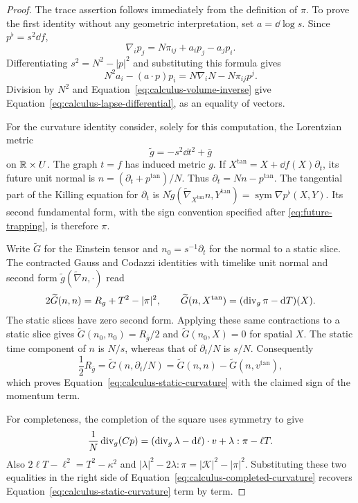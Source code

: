\begin{proof}
The trace assertion follows immediately from the definition of $\pi$.
To prove the first identity without any geometric interpretation, set
$a=\dd\log s$.  Since $p^\flat=s^2\dd f$,
\[
 \nabla_i p_j=N\pi_{ij}+a_i p_j-a_j p_i.
\]
Differentiating $s^2=N^2-|p|^2$ and substituting this formula gives
\[
 N^2a_i-(a\cdot p)p_i=N\nabla_iN-N\pi_{ij}p^j.
\]
Division by $N^2$ and Equation~\eqref{eq:calculus-volume-inverse} give
Equation~\eqref{eq:calculus-lapse-differential}, as an equality of vectors.

For the curvature identity consider, solely for this computation, the
Lorentzian metric
\[
 \widetilde g=-s^2\dd t^2+\bar g
\]
on $\mathbb R\times U$.  The graph $t=f$ has induced metric $g$.  If
$X^\mathrm{tan}=X+\dd f(X)\partial_t$, its future unit normal is
$n=(\partial_t+p^\mathrm{tan})/N$.  Thus
$\partial_t=Nn-p^\mathrm{tan}$.  The tangential part of the Killing
equation for $\partial_t$ is
$N\widetilde g(\widetilde\nabla_{X^\mathrm{tan}}n,Y^\mathrm{tan})
=\operatorname{sym}\nabla p^\flat(X,Y)$.
Its second fundamental form, with the sign convention specified after
\eqref{eq:future-trapping},
is therefore $\pi$.

Write $\widetilde G$ for the Einstein tensor and
$n_0=s^{-1}\partial_t$ for the normal to a static slice.  The contracted
Gauss and Codazzi identities with timelike unit normal and second form
$\widetilde g(\widetilde\nabla n,\cdot)$ read
\[
 2\widetilde G(n,n)=R_g+T^2-|\pi|^2,
 \qquad
 \widetilde G(n,X^\mathrm{tan})
       =(\operatorname{div}_g\pi-\mathop{}\!\mathrm d T)(X).
\]
The static slices have zero second form.  Applying these same contractions
to a static slice gives
$\widetilde G(n_0,n_0)=R_{\bar g}/2$ and
$\widetilde G(n_0,X)=0$ for spatial $X$.  The static time component of
$n$ is $N/s$, whereas that of $\partial_t/N$ is $s/N$.  Consequently
\[
 \frac12R_{\bar g}
 =\widetilde G(n,\partial_t/N)
 =\widetilde G(n,n)-\widetilde G(n,v^\mathrm{tan}),
\]
which proves Equation~\eqref{eq:calculus-static-curvature} with the
claimed sign of the momentum term.

For completeness, the completion of the square uses symmetry to give
\[
 \frac1N\operatorname{div}_g(Cp)
 =(\operatorname{div}_g\lambda-\mathop{}\!\mathrm d\ell)\cdot v
                         +\lambda:\pi-\ell T.
\]
Also $2\ell T-\ell^2=T^2-\kappa^2$ and
$|\lambda|^2-2\lambda:\pi=|\mathcal K|^2-|\pi|^2$.
Substituting these two equalities in the right side of
Equation~\eqref{eq:calculus-completed-curvature} recovers
Equation~\eqref{eq:calculus-static-curvature} term by term.
\end{proof}

